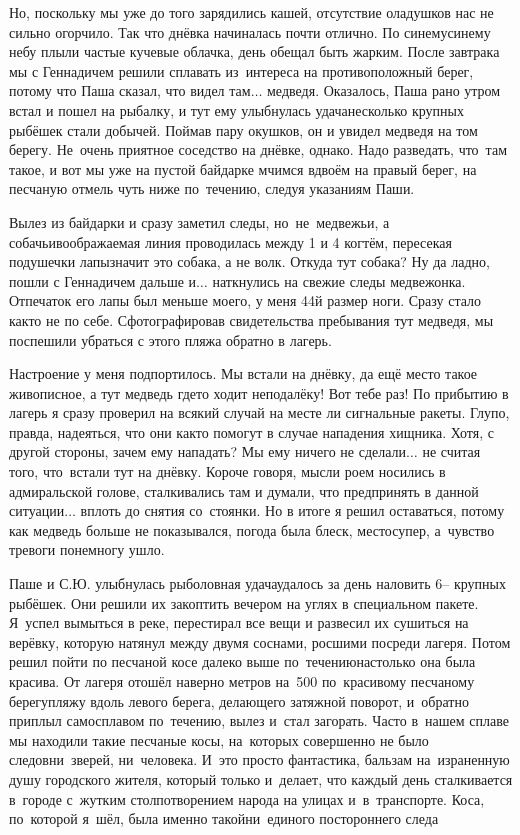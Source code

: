Но, поскольку мы уже до того зарядились кашей, отсутствие оладушков нас не сильно огорчило. Так что днёвка начиналась почти отлично. По синему\sdash синему небу плыли частые кучевые облачка, день обещал быть жарким. После завтрака мы с Геннадичем решили сплавать из~интереса на противоположный берег, потому что Паша сказал, что видел там$\ldots$ медведя. Оказалось, Паша рано утром встал и пошел на рыбалку, и тут ему улыбнулась удача\mdash несколько крупных рыбёшек стали добычей. Поймав пару окушков, он и увидел медведя на том берегу. Не~очень приятное соседство на днёвке, однако. Надо разведать, что~там такое, и вот мы уже на пустой байдарке мчимся вдвоём на правый берег, на песчаную отмель чуть ниже по~течению, следуя указаниям Паши.

\newpage
Вылез из байдарки и сразу заметил следы, но~не~медвежьи, а собачьи\mdash воображаемая линия проводилась между 1 и 4 когтём, пересекая подушечки лапы\mdash значит это собака, а не волк. Откуда тут собака? Ну да ладно, пошли с Геннадичем дальше и$\ldots$ наткнулись на свежие следы медвежонка. Отпечаток его лапы был меньше моего, у меня 44\sdash й размер ноги. Сразу стало как\sdash то не по себе. Сфотографировав свидетельства пребывания тут медведя, мы поспешили убраться с этого пляжа обратно в лагерь. 

Настроение у меня подпортилось. Мы встали на днёвку, да ещё место такое живописное, а тут медведь где\sdash то ходит неподалёку! Вот тебе раз! По прибытию в лагерь я сразу проверил на всякий случай на месте ли сигнальные ракеты. Глупо, правда, надеяться, что они как\sdash то помогут в случае нападения хищника. Хотя, с другой стороны, зачем ему нападать? Мы ему ничего не сделали$\ldots$ не считая того, что~встали тут на днёвку. Короче говоря, мысли роем носились в адмиральской голове, сталкивались там и думали, что предпринять в данной ситуации$\ldots$ вплоть до снятия со~стоянки. Но в итоге я решил оставаться, потому как медведь больше не показывался, погода была блеск, место\mdash супер, а~чувство тревоги понемногу ушло. 

Паше и С.Ю. улыбнулась рыболовная удача\mdash удалось за день наловить 6\thinspace\nobreakdash-- крупных рыбёшек. Они решили их закоптить вечером на углях в специальном пакете. Я~успел вымыться в реке, перестирал все вещи и развесил их сушиться на верёвку, которую натянул между двумя соснами, росшими посреди лагеря. Потом решил пойти по песчаной косе далеко выше по~течению\mdash настолько она была красива. От лагеря отошёл наверно метров на~500 по~красивому песчаному берегу\sdash пляжу вдоль левого берега, делающего затяжной поворот, и~обратно приплыл самосплавом по~течению, вылез и~стал загорать. Часто в~нашем сплаве мы находили такие песчаные косы, на~которых совершенно не было следов\mdash ни~зверей, ни~человека. И~это просто фантастика, бальзам на~израненную душу городского жителя, который только и~делает, что каждый день сталкивается в~городе с~жутким столпотворением народа на улицах и~в~транспорте. Коса, по~которой я~шёл, была именно такой\mdash ни~единого постороннего следа\mdash

